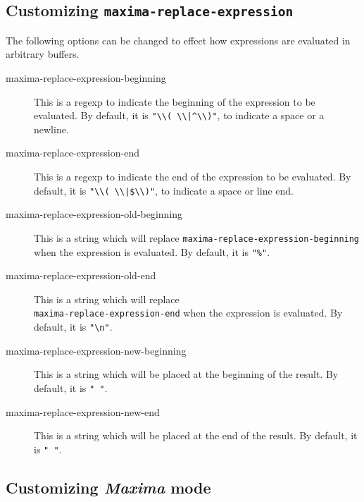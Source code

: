 \documentclass{article}
\newcommand{\mx}{\textsl{\sffamily Maxima}}
\begin{document}
\subsection{Customizing \texttt{maxima-replace-expression}}
\label{app:custrepexp}

The following options can be changed to effect how expressions are
evaluated in arbitrary buffers.
\begin{description}
\item[maxima-replace-expression-beginning] This is a regexp to
  indicate the beginning of the expression to be evaluated.  By
  default, it is \verb+"\\( \\|^\\)"+, to indicate a space or a
  newline. 
\item[maxima-replace-expression-end]  This is a regexp to indicate the
  end of the expression to be evaluated.  By default, it is 
  \verb+"\\( \\|$\\)"+, to indicate a space or line end.
\item[maxima-replace-expression-old-beginning] This is a string which
  will replace \texttt{maxima-replace-expression-beginning} when the
  expression is evaluated.  By default, it is \verb+"%"+.
\item[maxima-replace-expression-old-end] This is a string which
  will replace\\ \texttt{maxima-replace-expression-end} when the
  expression is evaluated.  By default, it is \verb+"\n"+.
\item[maxima-replace-expression-new-beginning] This is a string which
  will be placed at the beginning of the result.  By default, it is
  \verb+" "+.
\item[maxima-replace-expression-new-end] This is a string which
  will be placed at the end of the result.  By default, it is \verb+" "+.
\end{description}

\subsection{Customizing \mx{} mode}
\label{app:custmxmode}
\end{document}
